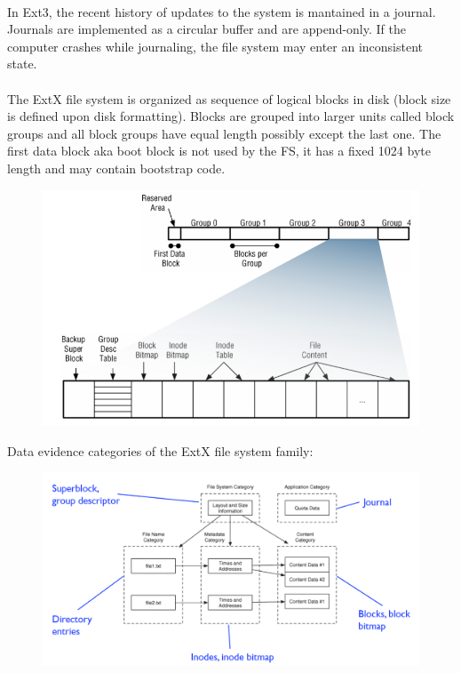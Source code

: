 \documentclass[10pt,a4paper]{report}
\begin{document}
\\
In Ext3, the recent history of updates to the system is mantained in a journal. Journals are implemented as a circular buffer and are append-only. If the computer crashes while journaling, the file system may enter an inconsistent state.\\
\\
The ExtX file system is organized as sequence of logical blocks in disk (block size is defined upon disk formatting). Blocks are grouped into larger units called block groups and all block groups have equal length possibly except the last one. The first data block aka boot block is not used by the FS, it has a fixed 1024 byte length and may contain bootstrap code.
\begin{figure}[H]
\centering
\includegraphics[scale=0.5]{31.png}
\end{figure}
Data evidence categories of the ExtX file system family:
\begin{figure}[H]
\centering
\includegraphics[scale=0.4]{12.png}
\end{figure}
\end{document}
